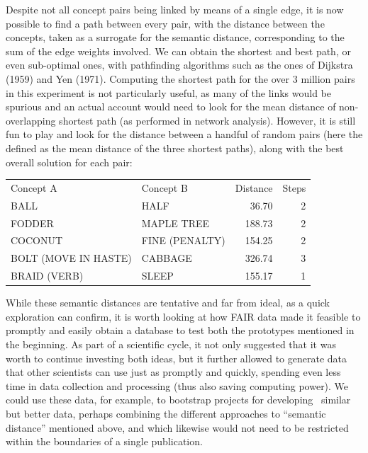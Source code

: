 \documentclass[
  a4paper,
  14pt,
  oneside,
  tablecaptionabove
]{scrbook}
\begin{document}
Despite not all concept pairs being linked by means of a single edge, it
is now possible to find a path between every pair, with the distance
between the concepts, taken as a surrogate for the semantic distance,
corresponding to the sum of the edge weights involved. We can obtain the
shortest and best path, or even sub-optimal ones, with pathfinding
algorithms such as the ones of Dijkstra (1959) and Yen (1971). Computing
the shortest path for the over 3 million pairs in this experiment is not
particularly useful, as many of the links would be spurious and an
actual account would need to look for the mean distance of
non-overlapping shortest path (as performed in network analysis).
However, it is still fun to play and look for the distance between a
handful of random pairs (here the defined as the mean distance of the
three shortest paths), along with the best overall solution for each
pair:

\begin{table}[h]
\centering
\begin{tabular}{llrr}
Concept A            & Concept B      & Distance & Steps \\
BALL                 & HALF           & 36.70    & 2     \\
FODDER               & MAPLE TREE     & 188.73   & 2     \\
COCONUT              & FINE (PENALTY) & 154.25   & 2     \\
BOLT (MOVE IN HASTE) & CABBAGE        & 326.74   & 3     \\
BRAID (VERB)         & SLEEP          & 155.17   & 1    
\end{tabular}
\end{table}

While these semantic distances are tentative and far from ideal, as a
quick exploration can confirm, it is worth looking at how FAIR data made
it feasible to promptly and easily obtain a database to test both the
prototypes mentioned in the beginning. As part of a scientific cycle, it
not only suggested that it was worth to continue investing both ideas,
but it further allowed to generate data that other scientists can use
just as promptly and quickly, spending even less time in data collection
and processing (thus also saving computing power). We could use these
data, for example, to bootstrap projects for developing~ similar but
better data, perhaps combining the different approaches to
\enquote{semantic distance} mentioned above, and which likewise would
not need to be restricted within the boundaries of a single publication.
\end{document}
